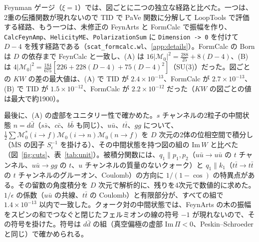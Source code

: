 \documentclass[a4paper,10pt]{ltjsarticle}
\begin{document}
Feynman ゲージ（$\xi=1$）では、図ごとに二つの独立な経路と比べた。一つは、2重の伝播関数が現れないので TID で PaVe 関数に分解して LoopTools で評価する経路、もう一つは、未修正の FeynArts と FormCalc で振幅を作り、\texttt{CalcFeynAmp}、\texttt{HelicityME}、\texttt{PolarizationSum} に \texttt{Dimension -> 0} を付けて $D-4$ を残す経路である（\texttt{scat\_formcalc.wl}、\ref{app:details}）。FormCalc の Born は $D$ の依存まで FeynCalc と一致し、(A) は $16|\mathcal M_0|^2=\frac{288}{25}+8(D-4)$、(B) は $4|\mathcal M_0|^2=\frac{184}{675}[226+228(D-4)+75(D-4)^2]$（SU(3)）だった。図ごとの $KW$ の差の最大値は、(A) で TID が $2.4\times10^{-13}$、FormCalc が $2.7\times10^{-13}$、(B) で TID が $1.5\times10^{-12}$、FormCalc が $2.2\times10^{-12}$ だった（$KW$ の図ごとの値は最大で約1900）。

最後に、(A) の虚部をユニタリー性で確かめた。$s$ チャンネルの2粒子の中間状態 $n=d\bar d$（$s\bar s$、$c\bar c$、$b\bar b$ も同じ）、$u\bar u$、$t\bar t$、$gg$ について、$\frac12\sum\mathcal M_0^*(i\to f)\mathcal M_0(i\to n)\mathcal M_0(n\to f)$ を $D$ 次元の2体の位相空間で積分し（$\overline{\mathrm{MS}}$ の因子 $S_\epsilon^{-1}$ を掛ける）、その中間状態を持つ図の組の $\mathrm{Im}\,W$ と比べた（図~\ref{fig:cuts}、表~\ref{tab:unit}）。被積分関数には、$q_1\parallel p_1,p_2$（$u\bar u\to u\bar u$ の $t$ チャンネル、$u\bar u\to gg$ の $t$、$u$ チャンネルの質量のないクォーク）と $q_1\parallel k_1$（$t\bar t\to t\bar t$ の $t$ チャンネルのグルーオン、Coulomb）の方向に $1/(1-\cos)$ の特異点がある。その留数の角度積分を $D$ 次元で解析的に、残りを4次元で数値的に求めた。$1/\epsilon$ の係数（$u\bar u$ の共線、$t\bar t$ の Coulomb）と有限部分が、すべての組で $1.4\times10^{-13}$ 以内で一致した。クォーク対の中間状態では、FeynArts の木の振幅をスピンの和でつなぐと閉じたフェルミオンの線の符号 $-1$ が現れないので、その符号を掛けた。符号は $d\bar d$ の組（真空偏極の虚部 $\mathrm{Im}\,\Pi<0$、Peskin--Schroeder と同じ）で確かめられる。
\end{document}
